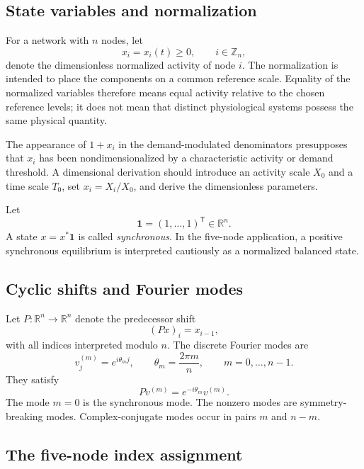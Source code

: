 \documentclass[11pt, reqno]{amsart}
\theoremstyle{definition}
\theoremstyle{remark}
\newcommand{\R}{\mathbb{R}}
\newcommand{\Z}{\mathbb{Z}}
\newcommand{\one}{\mathbf{1}}
\begin{document}
	\subsection{State variables and normalization}
	
	For a network with $n$ nodes, let
	\[
	x_i=x_i(t)\ge 0, \qquad i\in\Z_n,
	\]
	denote the dimensionless normalized activity of node $i$.  The normalization is
	intended to place the components on a common reference scale.  Equality of the
	normalized variables therefore means equal activity relative to the chosen
	reference levels; it does not mean that distinct physiological systems possess
	the same physical quantity.
	
	The appearance of $1+x_i$ in the demand-modulated denominators presupposes that
	$x_i$ has been nondimensionalized by a characteristic activity or demand
	threshold.  A dimensional derivation should introduce an activity scale $X_0$
	and a time scale $T_0$, set $x_i=X_i/X_0$, and derive the dimensionless
	parameters.
	
	
	Let
	\[
	\one=(1,\ldots,1)^{\mathsf T}\in\R^n.
	\]
	A state $x=x^*\one$ is called \emph{synchronous}.  In the five-node application,
	a positive synchronous equilibrium is interpreted cautiously as a normalized
	balanced state.
	
	\subsection{Cyclic shifts and Fourier modes}
	
	Let $P:\R^n\to\R^n$ denote the predecessor shift
	\[
	(Px)_i=x_{i-1},
	\]
	with all indices interpreted modulo $n$.  The discrete Fourier modes are
	\[
	v^{(m)}_j=e^{i\theta_m j},
	\qquad
	\theta_m=\frac{2\pi m}{n},
	\qquad
	m=0,\ldots,n-1.
	\]
	They satisfy
	\[
	Pv^{(m)}=e^{-i\theta_m}v^{(m)}.
	\]
	The mode $m=0$ is the synchronous mode.  The nonzero modes are
	symmetry-breaking modes.  Complex-conjugate modes occur in pairs
	$m$ and $n-m$.
	
	\subsection{The five-node index assignment}
	
\end{document}
